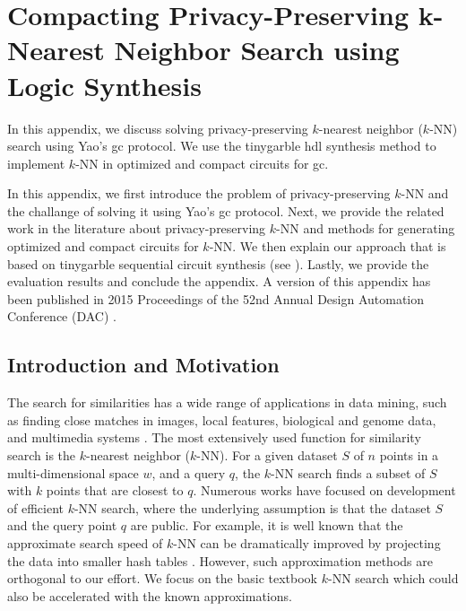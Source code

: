 \chapter{Compacting Privacy-Preserving k-Nearest Neighbor Search using Logic Synthesis}\label{chap:knn}
In this appendix, we discuss solving privacy-preserving $k$-nearest neighbor ($k$-NN) search using Yao's \acrshort{gc} protocol.
We use the \gls{tinygarble} \acrshort{hdl} synthesis method to implement $k$-NN in optimized and compact circuits for \acrshort{gc}.

In this appendix, we first introduce the problem of privacy-preserving $k$-NN and the challange of solving it using Yao's \acrshort{gc} protocol.
Next, we provide the related work in the literature about privacy-preserving $k$-NN and methods for generating optimized and compact circuits for $k$-NN.
We then explain our approach that is based on \gls{tinygarble} sequential circuit synthesis (see ).
Lastly, we provide the evaluation results and conclude the appendix.
A version of this appendix has been published in 2015 Proceedings of the 52nd Annual Design Automation Conference (DAC) \cite{songhori2015compacting}.

\section{Introduction and Motivation}\label{sec:knn-intro}
The search for similarities has a wide range of applications in data mining, such as finding close matches in images, local features, biological and genome data, and multimedia systems \cite{qi2008efficient}.
The most extensively used function for similarity search is the $k$-nearest neighbor ($k$-NN).
For a given dataset $S$ of $n$ points in a multi-dimensional space $w$, and a query $q$, the $k$-NN search finds a subset of $S$ with $k$ points that are closest to $q$.
Numerous works have focused on development of efficient $k$-NN search, where the underlying assumption is that the dataset $S$ and the query point $q$ are public.
For example, it is well known that the approximate search speed of $k$-NN can be dramatically improved by projecting the data into smaller hash tables \cite{andoni2006near,weiss2009spectral}.
However, such approximation methods are orthogonal to our effort.
We focus on the basic textbook $k$-NN search which could also be accelerated with the known approximations.

